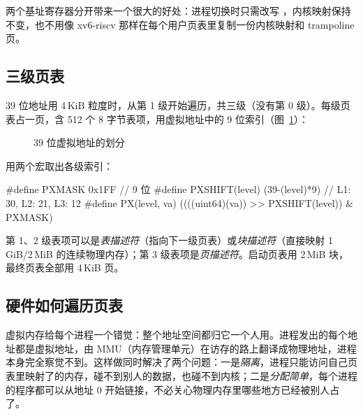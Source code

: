 两个基址寄存器分开带来一个很大的好处：进程切换时只需改写 ，内核映射保持不变，也不用像 xv6-riscv 那样在每个用户页表里复制一份内核映射和 trampoline 页。

\subsection{三级页表}

39 位地址用 4\,KiB 粒度时，从第 1 级开始遍历，共三级（没有第 0 级）。每级页表占一页，含 512 个 8 字节表项，用虚拟地址中的 9 位索引（图~\ref{fig:va}）：

\begin{figure}[htbp]
  \centering
  \caption{39 位虚拟地址的划分}
  \label{fig:va}
\end{figure}

 用两个宏取出各级索引：

\begin{ccode}
#define PXMASK          0x1FF                    // 9 位
#define PXSHIFT(level)  (39-(level)*9)           // L1: 30, L2: 21, L3: 12
#define PX(level, va)   ((((uint64)(va)) >> PXSHIFT(level)) & PXMASK)
\end{ccode}

第 1、2 级表项可以是\emph{表描述符}（指向下一级页表）或\emph{块描述符}（直接映射 1\,GiB/2\,MiB 的连续物理内存）；第 3 级表项是\emph{页描述符}。启动页表用 2\,MiB 块，最终页表全部用 4\,KiB 页。

\subsection{硬件如何遍历页表}
\label{sec:hw-walk}

虚拟内存给每个进程一个错觉：整个地址空间都归它一个人用。进程发出的每个地址都是虚拟地址，由 MMU（内存管理单元）在访存的路上翻译成物理地址，进程本身完全察觉不到。这样做同时解决了两个问题：一是\emph{隔离}，进程只能访问自己页表里映射了的内存，碰不到别人的数据，也碰不到内核；二是\emph{分配简单}，每个进程的程序都可以从地址 0 开始链接，不必关心物理内存里哪些地方已经被别人占了。

